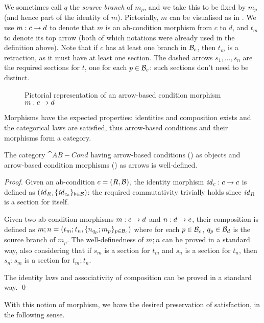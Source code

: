 We sometimes call $q$ the \emph{source branch} of $m_p$, and we take this to be fixed by $m_p$ (and hence part of the identity of $m$). Pictorially, $m$ can be visualised as in . We use $m:c\rightarrow d$ to denote that $m$ is an ab-condition morphism from $c$ to $d$, and $t_m$ to denote its top arrow (both of which notations were already used in the definition above). Note that if $c$ has at least one branch in $\mathcal{B}_c$, then $t_m$ is a retraction, as it must have at least one section.  The dashed arrows $s_1, \ldots, s_n$ are the required sections for $t$, one for each $p\in \mathcal{B}_c$: such sections don't need to be distinct.  

%
\begin{figure}
  \centering
  
  \caption{Pictorial representation of an arrow-based condition morphism $m:c\rightarrow d$}
\end{figure}

\medskip\noindent Morphisms have the expected properties: identities and composition exists and the categorical laws are satisfied, thus arrow-based conditions and their morphisms form a category.
%

\begin{proposition}
  The category $\cat{AB-Cond}$ having arrow-based conditions () as objects and arrow-based condition morphisms () as arrows is well-defined.
\end{proposition}

\begin{proof}
  Given an ab-condition $c=(R,\mathcal{B})$, the identity morphism $\mathit{id}_c:c\rightarrow c$ is defined as $(\mathit{id}_R,\{{\mathit{id}_{c_b}}\}_{b\in \mathcal{B}})$: the required commutativity trivially holds since $\mathit{id}_R$ is a section for itself.
  
Given two ab-condition morphisms $m:c\rightarrow d$ and $n:d\rightarrow e$, their composition is defined as $m;n=(t_m;t_n,\{{n_{q_p};m_p}\}_{p\in \mathcal{B}_c})$ where for each $p\in \mathcal{B}_c$, $q_p\in \mathcal{B}_d$ is the source branch of $m_p$.
The well-definedness of $m;n$ can be proved in a standard way, also considering that if $s_m$ is a section for $t_m$ and $s_n$ is a section for $t_n$, then $s_n;s_m$ is a section for $t_m;t_n$.

The identity laws and associativity of composition can be proved in a standard way. \qed
\end{proof}

With this notion of morphism, we have the desired preservation of satisfaction, in the following sense.

